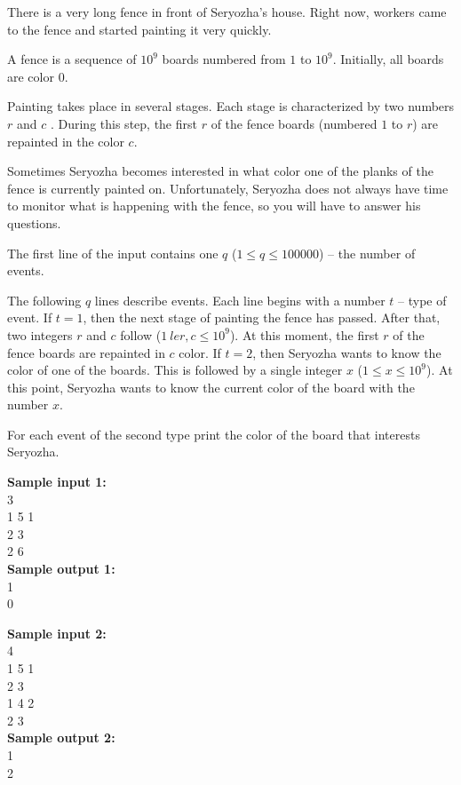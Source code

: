 \documentclass[a4paper]{article}
\begin{document}
There is a very long fence in front of Seryozha’s house. Right now, workers came to the fence and started painting it very quickly.

A fence is a sequence of $10^9$ boards numbered from $1$ to $10^9$. Initially, all boards are color $0$.

Painting takes place in several stages. Each stage is characterized by two numbers $r$ and $c$ . During this step, the first $r$ of the fence boards (numbered $1$ to $r$) are repainted in the color $c$.

Sometimes Seryozha becomes interested in what color one of the planks of the fence is currently painted on. Unfortunately, Seryozha does not always have time to monitor what is happening with the fence, so you will have to answer his questions.

The first line of the input contains one $q$ ($1 \le q \le 100000$) -- the number of events.

The following $q$ lines describe events. Each line begins with a number $t$ -- type of event.
If $t = 1$, then the next stage of painting the fence has passed. After that, two integers $r$ and $c$ follow ($1 \ le r, c \le 10^9$). At this moment, the first $r$ of the fence boards are repainted in $c$ color.
If $t = 2$, then Seryozha wants to know the color of one of the boards. This is followed by a single integer $x$ ($1 \le x \le 10^9$). At this point, Seryozha wants to know the current color of the board with the number $x$.

For each event of the second type print the color of the board that interests Seryozha.

\LINE

\noindent \textbf{Sample input 1:}\\
3\\
1 5 1\\
2 3\\
2 6\\


\noindent \textbf{Sample output 1:}\\
1\\
0\\


\SPACE


\noindent \textbf{Sample input 2:}\\
4\\
1 5 1\\
2 3\\
1 4 2\\
2 3\\


\noindent \textbf{Sample output 2:}\\
1\\
2\\
\end{document}
